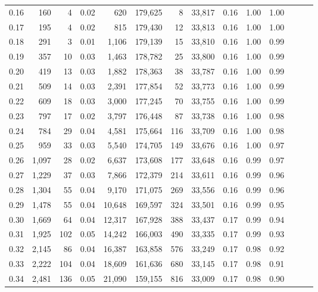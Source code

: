 \begin{tabular}{rrrrrrrrrrrrrr}
0.16 &    160 &    4 &  0.02 &      620 &  179,625 &       8 &  33,817 &  0.16 &  1.00 &      1.00 \\
0.17 &    195 &    4 &  0.02 &      815 &  179,430 &      12 &  33,813 &  0.16 &  1.00 &      1.00 \\
0.18 &    291 &    3 &  0.01 &    1,106 &  179,139 &      15 &  33,810 &  0.16 &  1.00 &      0.99 \\
0.19 &    357 &   10 &  0.03 &    1,463 &  178,782 &      25 &  33,800 &  0.16 &  1.00 &      0.99 \\
0.20 &    419 &   13 &  0.03 &    1,882 &  178,363 &      38 &  33,787 &  0.16 &  1.00 &      0.99 \\
0.21 &    509 &   14 &  0.03 &    2,391 &  177,854 &      52 &  33,773 &  0.16 &  1.00 &      0.99 \\
0.22 &    609 &   18 &  0.03 &    3,000 &  177,245 &      70 &  33,755 &  0.16 &  1.00 &      0.99 \\
0.23 &    797 &   17 &  0.02 &    3,797 &  176,448 &      87 &  33,738 &  0.16 &  1.00 &      0.98 \\
0.24 &    784 &   29 &  0.04 &    4,581 &  175,664 &     116 &  33,709 &  0.16 &  1.00 &      0.98 \\
0.25 &    959 &   33 &  0.03 &    5,540 &  174,705 &     149 &  33,676 &  0.16 &  1.00 &      0.97 \\
0.26 &  1,097 &   28 &  0.02 &    6,637 &  173,608 &     177 &  33,648 &  0.16 &  0.99 &      0.97 \\
0.27 &  1,229 &   37 &  0.03 &    7,866 &  172,379 &     214 &  33,611 &  0.16 &  0.99 &      0.96 \\
0.28 &  1,304 &   55 &  0.04 &    9,170 &  171,075 &     269 &  33,556 &  0.16 &  0.99 &      0.96 \\
0.29 &  1,478 &   55 &  0.04 &   10,648 &  169,597 &     324 &  33,501 &  0.16 &  0.99 &      0.95 \\
0.30 &  1,669 &   64 &  0.04 &   12,317 &  167,928 &     388 &  33,437 &  0.17 &  0.99 &      0.94 \\
0.31 &  1,925 &  102 &  0.05 &   14,242 &  166,003 &     490 &  33,335 &  0.17 &  0.99 &      0.93 \\
0.32 &  2,145 &   86 &  0.04 &   16,387 &  163,858 &     576 &  33,249 &  0.17 &  0.98 &      0.92 \\
0.33 &  2,222 &  104 &  0.04 &   18,609 &  161,636 &     680 &  33,145 &  0.17 &  0.98 &      0.91 \\
0.34 &  2,481 &  136 &  0.05 &   21,090 &  159,155 &     816 &  33,009 &  0.17 &  0.98 &      0.90 \\

\end{tabular}
